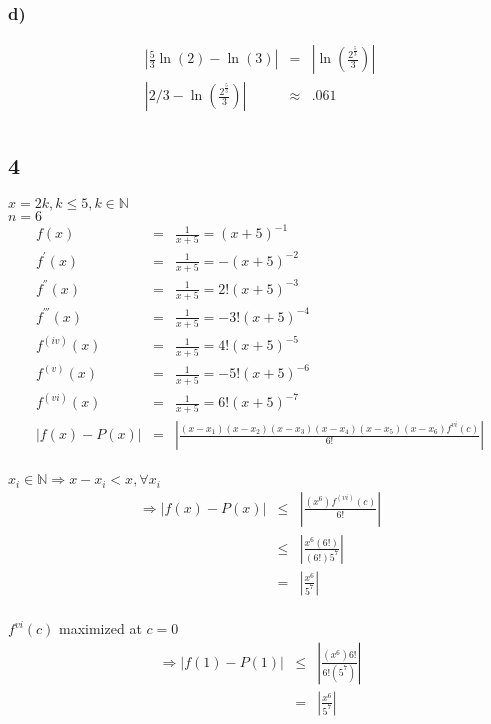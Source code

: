 \documentclass[12pt]{article}
\begin{document}
\subsubsection*{d)}
\begin{eqnarray*}
  |\frac{5}{3}\ln(2) - \ln(3)| & = & |\ln(\frac{2^{\frac{5}{3}}}{3})|\\
  |2/3 - \ln(\frac{2^{\frac{5}{3}}}{3})| & \approx & .061\\
\end{eqnarray*}
\subsection*{4}
\(x = 2k, k \leq 5, k \in \mathbb{N}\)\\
\(n = 6\)
\begin{eqnarray*}
  f(x) & = & \frac{1}{x+5} = (x+5)^{-1}\\
  f^{'}(x) & = & \frac{1}{x+5} = -(x+5)^{-2}\\
  f^{''}(x) & = & \frac{1}{x+5} = 2!(x+5)^{-3}\\
  f^{'''}(x) & = & \frac{1}{x+5} = -3!(x+5)^{-4}\\
  f^{(iv)}(x) & = & \frac{1}{x+5} = 4!(x+5)^{-5}\\
  f^{(v)}(x) & = & \frac{1}{x+5} = -5!(x+5)^{-6}\\
  f^{(vi)}(x) & = & \frac{1}{x+5} = 6!(x+5)^{-7}\\
  |f(x) - P(x)| & = & |\frac{(x-x_1)(x-x_2)(x-x_3)(x-x_4)(x-x_5)(x-x_6)f^{vi}(c)}{6!}|\\
\end{eqnarray*}

\(x_i \in \mathbb{N} \Rightarrow x-x_i < x, \forall x_i\)\\


\begin{eqnarray*}
  \Rightarrow |f(x) - P(x)| & \leq & \left|\frac{(x^6)f^{(vi)}(c)}{6!}\right|\\
  & \leq & \left|\frac{x^6(6!)}{(6!)5^{7}}\right|\\
  & = & \left|\frac{x^6}{5^{7}}\right|\\
\end{eqnarray*}

\(f^{vi}(c)\) maximized at \(c = 0\)\\
\begin{eqnarray*}
  \Rightarrow |f(1) - P(1)| & \leq & \left|\frac{(x^6)6!}{6!(5^7)}\right|\\
  & = & \left|\frac{x^6}{5^{7}}\right|\\
\end{eqnarray*}
\end{document}
